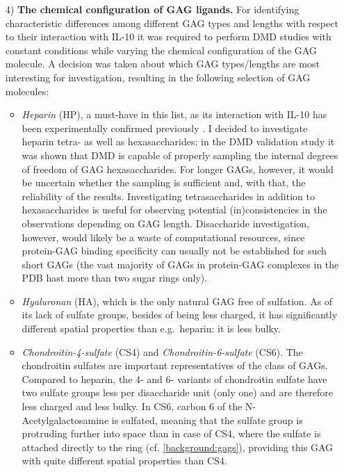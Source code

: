 \begin{itemize}


\item[4)] \textbf{The chemical configuration of GAG ligands.} For identifying
characteristic differences among different GAG types and lengths with respect to
their interaction with IL-10 it was required to perform DMD studies with
constant conditions while varying the chemical configuration of the GAG
molecule. A decision was taken about which GAG types/lengths are most
interesting for investigation, resulting in the following selection of GAG
molecules:

\begin{itemize}

\item \textit{Heparin} (HP), a must-have in this list, as its interaction with
IL-10 has been experimentally confirmed previously \cite{salek_ardakani_2000}. I
decided to investigate heparin tetra- as well as hexasaccharides: in the DMD
validation study it was shown that DMD is capable of properly sampling the
internal degrees of freedom of GAG hexasaccharides. For longer GAGs, however, it
would be uncertain whether the sampling is sufficient and, with that, the
reliability of the results. Investigating tetrasaccharides in addition to
hexasaccharides is useful for observing potential (in)consistencies in the
observations depending on GAG length. Disaccharide investigation, however, would
likely be a waste of computational resources, since protein-GAG binding
specificity can usually not be established for such short GAGs (the vast
majority of GAGs in protein-GAG complexes in the PDB hast more than two sugar
rings only).

\item \textit{Hyaluronan} (HA), which is the only natural GAG free of sulfation.
As of its lack of sulfate groups, besides of being less charged, it has
significantly different spatial properties than e.g.\ heparin: it is less bulky.

\item \textit{Chondroitin-4-sulfate} (CS4) and \textit{Chondroitin-6-sulfate}
(CS6). The chondroitin sulfates are important representatives of the class of
GAGs. Compared to heparin, the 4- and 6- variants of chondroitin sulfate have
two sulfate groups less per disaccharide unit (only one) and are therefore less
charged and less bulky. In CS6, carbon 6 of the N-Acetyl\-ga\-lacto\-sa\-mine is
sulfated, meaning that the sulfate group is protruding further into space than
in case of CS4, where the sulfate is attached directly to the ring (cf.
\cref{background:gags}), providing this GAG with quite different spatial
properties than CS4.

\end{itemize}

\end{itemize}

